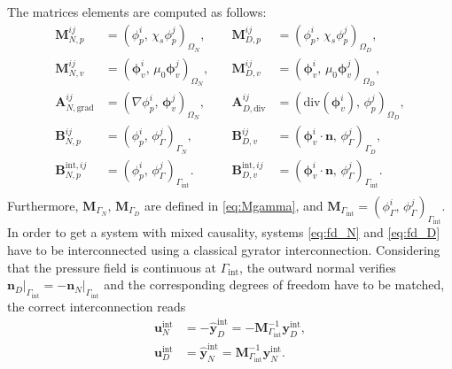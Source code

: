 \documentclass{ifacconf}
\begin{document}
The matrices elements are computed as follows:
\begin{equation*}
\begin{aligned}
\mathbf{M}_{N, p}^{ij} &= ({\phi}_{p}^i,\, \chi_s {\phi}_{p}^j)_{\Omega_N}, \\ \mathbf{M}_{N, v}^{ij} &= (\bm{\phi}_{v}^i,\, \mu_0 \bm{\phi}_{v}^j)_{\Omega_N}, \\
\mathbf{A}_{N, \mathrm{grad}}^{ij} &= (\nabla{\phi}_{p}^{i},\, \bm{\phi}_{v}^j)_{\Omega_N}, \\
\mathbf{B}_{N, p}^{ij} &= ({\phi}_{p}^{i},\, {\phi}_{\Gamma}^{j})_{\Gamma_N}, \\
\mathbf{B}_{N, p}^{\text{int}, ij} &= ({\phi}_{p}^{i},\, {\phi}_{\Gamma}^{j})_{\Gamma_{\text{int}}}. \\
\end{aligned} \quad 
\begin{aligned}
\mathbf{M}_{D, p}^{ij} &= ({\phi}_{p}^i,\, \chi_s {\phi}_{p}^j)_{\Omega_D}, \\ \mathbf{M}_{D, v}^{ij} &= (\bm{\phi}_{v}^i,\, \mu_0 \bm{\phi}_{v}^j)_{\Omega_D}, \\
\mathbf{A}_{D, \mathrm{div}}^{ij} &= (\mathrm{div}(\bm{\phi}_{v}^i),\, \phi_{p}^{j})_{\Omega_D}, \\
\mathbf{B}_{D, v}^{ij} &= (\bm{\phi}_{v}^{i} \cdot \bm{n},\, {\phi}_{\Gamma}^{j})_{\Gamma_D}, \\
\mathbf{B}_{D, v}^{\text{int}, ij} &= (\bm{\phi}_{v}^{i} \cdot \bm{n},\, {\phi}_{\Gamma}^{j})_{\Gamma_{\text{int}}}. \\
\end{aligned}
\end{equation*}
Furthermore, $\mathbf{M}_{\Gamma_{N}},\, \mathbf{M}_{\Gamma_{D}}$ are defined in \eqref{eq:Mgamma}, and $\mathbf{M}_{\Gamma_{\text{int}}} = ({\phi}_{\Gamma}^{i},\, {\phi}_{\Gamma}^{j})_{\Gamma_{\text{int}}}$. In order to get a system with mixed causality, systems \eqref{eq:fd_N} and \eqref{eq:fd_D} have to be interconnected using a classical gyrator interconnection. Considering that the pressure field is continuous at $\Gamma_{\text{int}}$, the outward normal verifies $\bm{n}_D \vert_{\Gamma_{\text{int}}}= - \bm{n}_N \vert_{\Gamma_{\text{int}}}$ and the corresponding degrees of freedom have to be matched, the correct interconnection reads
\begin{equation}
\begin{aligned}{}
\mathbf{u}_N^{\text{int}} &= - \widehat{\mathbf{y}}_D^{\text{int}} = - \mathbf{M}_{\Gamma_{\text{int}}}^{-1} \mathbf{y}_D^{\text{int}}, \\
\mathbf{u}_D^{\text{int}} &= \widehat{\mathbf{y}}_N^{\text{int}} = \mathbf{M}_{\Gamma_{\text{int}}}^{-1} \mathbf{y}_N^{\text{int}}.
\end{aligned}
\end{equation}
\end{document}
